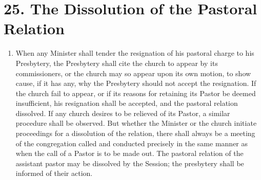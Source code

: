 \documentclass[
]{book}
\begin{document}
\hypertarget{the-dissolution-of-the-pastoral-relation}{%
\section*{25. The Dissolution of the Pastoral Relation}\label{the-dissolution-of-the-pastoral-relation}}

\protect\hypertarget{chapter-slug-25-the-dissolution-of-the-pastoral-relation}{\href{}{}}

\begin{enumerate}
\def\labelenumi{\arabic{enumi}.}
\item
  \protect\hypertarget{25}{\href{}{}}When any Minister shall tender the resignation of his pastoral charge to his Presbytery, the Presbytery shall cite the church to appear by its commissioners, or the church may so appear upon its own motion, to show cause, if it has any, why the Presbytery should not accept the resignation. If the church fail to appear, or if its reasons for retaining its Pastor be deemed insufficient, his resignation shall be accepted, and the pastoral relation dissolved. If any church desires to be relieved of its Pastor, a similar procedure shall be observed. But whether the Minister or the church initiate proceedings for a dissolution of the relation, there shall always be a meeting of the congregation called and conducted precisely in the same manner as when the call of a Pastor is to be made out. The pastoral relation of the assistant pastor may be dissolved by the Session; the presbytery shall be informed of their action.


\end{enumerate}
\end{document}
